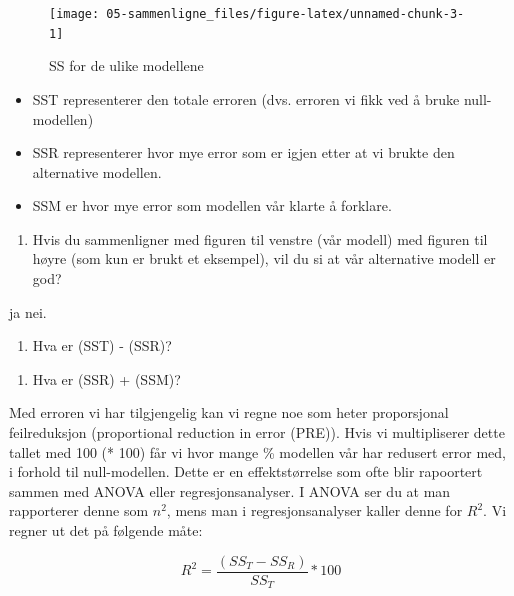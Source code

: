 \documentclass[
]{book}
\providecommand{\tightlist}{%
  \setlength{\itemsep}{0pt}\setlength{\parskip}{0pt}}
\begin{document}
\begin{figure}

{\centering \texttt{[image: 05-sammenligne\_files/figure-latex/unnamed-chunk-3-1]} 

}

\caption{SS for de ulike modellene}\label{fig:unnamed-chunk-3}
\end{figure}

\begin{itemize}
\tightlist
\item
  SST representerer den totale erroren (dvs. erroren vi fikk ved å bruke null-modellen)
\item
  SSR representerer hvor mye error som er igjen etter at vi brukte den alternative modellen.
\item
  SSM er hvor mye error som modellen vår klarte å forklare.
\end{itemize}

\begin{enumerate}
\def\labelenumi{\alph{enumi}.}
\setcounter{enumi}{4}
\tightlist
\item
  Hvis du sammenligner med figuren til venstre (vår modell) med figuren til høyre (som kun er brukt et eksempel), vil du si at vår alternative modell er god?
\end{enumerate}

ja nei.

\begin{enumerate}
\def\labelenumi{\alph{enumi}.}
\setcounter{enumi}{3}
\tightlist
\item
  Hva er (SST) - (SSR)?
\end{enumerate}

\begin{enumerate}
\def\labelenumi{\alph{enumi}.}
\setcounter{enumi}{4}
\tightlist
\item
  Hva er (SSR) + (SSM)?
\end{enumerate}

Med erroren vi har tilgjengelig kan vi regne noe som heter proporsjonal feilreduksjon (proportional reduction in error (PRE)). Hvis vi multipliserer dette tallet med 100 (* 100) får vi hvor mange \% modellen vår har redusert error med, i forhold til null-modellen. Dette er en effektstørrelse som ofte blir rapoortert sammen med ANOVA eller regresjonsanalyser. I ANOVA ser du at man rapporterer denne som \(n^2\), mens man i regresjonsanalyser kaller denne for \(R^2\). Vi regner ut det på følgende måte:

\[
R^2 = \frac{(SS_T - SS_R)}{SS_T} * 100
\]
\end{document}
